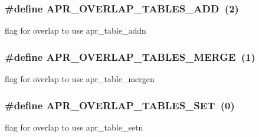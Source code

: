 \subsubsection[{\texorpdfstring{A\+P\+R\+\_\+\+O\+V\+E\+R\+L\+A\+P\+\_\+\+T\+A\+B\+L\+E\+S\+\_\+\+A\+DD}{APR_OVERLAP_TABLES_ADD}}]{\setlength{\rightskip}{0pt plus 5cm}\#define A\+P\+R\+\_\+\+O\+V\+E\+R\+L\+A\+P\+\_\+\+T\+A\+B\+L\+E\+S\+\_\+\+A\+DD~(2)}\hypertarget{group__apr__tables_gaeb34b58105a0ca1a6c4098de0e38bae2}{}\label{group__apr__tables_gaeb34b58105a0ca1a6c4098de0e38bae2}
flag for overlap to use apr\+\_\+table\+\_\+addn 
\subsubsection[{\texorpdfstring{A\+P\+R\+\_\+\+O\+V\+E\+R\+L\+A\+P\+\_\+\+T\+A\+B\+L\+E\+S\+\_\+\+M\+E\+R\+GE}{APR_OVERLAP_TABLES_MERGE}}]{\setlength{\rightskip}{0pt plus 5cm}\#define A\+P\+R\+\_\+\+O\+V\+E\+R\+L\+A\+P\+\_\+\+T\+A\+B\+L\+E\+S\+\_\+\+M\+E\+R\+GE~(1)}\hypertarget{group__apr__tables_ga553eea6eb6fea4bafaf4cbd7acafdf5f}{}\label{group__apr__tables_ga553eea6eb6fea4bafaf4cbd7acafdf5f}
flag for overlap to use apr\+\_\+table\+\_\+mergen 
\subsubsection[{\texorpdfstring{A\+P\+R\+\_\+\+O\+V\+E\+R\+L\+A\+P\+\_\+\+T\+A\+B\+L\+E\+S\+\_\+\+S\+ET}{APR_OVERLAP_TABLES_SET}}]{\setlength{\rightskip}{0pt plus 5cm}\#define A\+P\+R\+\_\+\+O\+V\+E\+R\+L\+A\+P\+\_\+\+T\+A\+B\+L\+E\+S\+\_\+\+S\+ET~(0)}\hypertarget{group__apr__tables_ga867455bb7008872e03b08c0742f9698c}{}\label{group__apr__tables_ga867455bb7008872e03b08c0742f9698c}
flag for overlap to use apr\+\_\+table\+\_\+setn 

